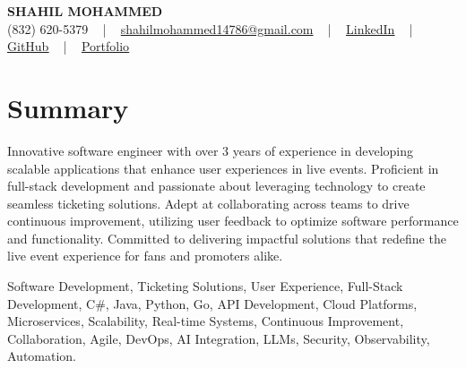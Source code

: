 \documentclass[letterpaper,10pt]{article}
\begin{document}
\begin{center}
    {\fontsize{14pt}{12pt}\selectfont \textbf{\MakeUppercase{Shahil Mohammed}}}\\ \vspace{2pt}
    \fontsize{10pt}{12pt}\selectfont (832) 620-5379 ~ | ~ \href{mailto:shahilmohammed14786@gmail.com}{shahilmohammed14786@gmail.com} ~ | ~  
    \href{https://www.linkedin.com/in/shahil-mohammed-9652931a1/}{\color{blue}\underline{LinkedIn}}  ~ | ~ 
    \href{https://github.com/freakbeast14}{\color{blue}\underline{GitHub}} ~ | ~ 
    \href{https://shahil-mohammed.netlify.app/}{\color{blue}\underline{Portfolio}}
    \vspace{-8pt}
\end{center}

\section{Summary}
\vspace{-2pt}\fontsize{8pt}{9pt}\selectfont
Innovative software engineer with over 3 years of experience in developing scalable applications that enhance user experiences in live events. Proficient in full-stack development and passionate about leveraging technology to create seamless ticketing solutions. Adept at collaborating across teams to drive continuous improvement, utilizing user feedback to optimize software performance and functionality. Committed to delivering impactful solutions that redefine the live event experience for fans and promoters alike.
 \vspace{-5pt}
 
{\fontsize{1pt}{1pt}\selectfont\color{white}
Software Development, Ticketing Solutions, User Experience, Full-Stack Development, C#, Java, Python, Go, API Development, Cloud Platforms, Microservices, Scalability, Real-time Systems, Continuous Improvement, Collaboration, Agile, DevOps, AI Integration, LLMs, Security, Observability, Automation.
}
\vspace{-8pt}

\vspace{-2pt}
\end{document}
